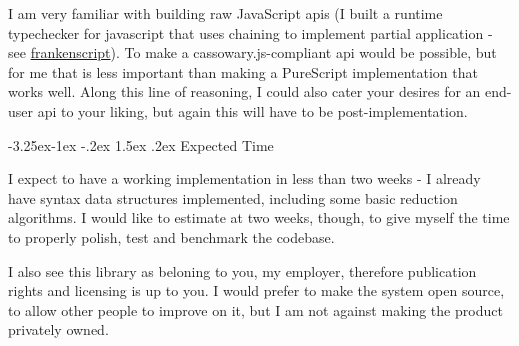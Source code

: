\documentclass[11pt,pressrelease]{newlfm} %
\makeatletter
\newcounter{section}
\newcounter{subsection}[section]
\newcommand\subsection{\@startsection{subsection}{2}{\z@}%
                                     {-3.25ex\@plus -1ex \@minus -.2ex}%
                                     {1.5ex \@plus .2ex}%
                                     {\normalfont\large\bfseries}}
\makeatother
\begin{document}
\begin{newlfm}
\begin{singlespace}
I am very familiar with building raw JavaScript apis (I built a runtime typechecker for javascript
that uses chaining to implement partial application - see
\href{http://github.com/athanclark/frankenscript}{frankenscript}). To make a cassowary.js-compliant
api would be possible, but for me that is less important than making a PureScript implementation that works
well. Along this line of reasoning, I could also cater your desires for an end-user api to your liking,
but again this will have to be post-implementation.

\subsection{Expected Time}

I expect to have a working implementation in less than two weeks - I already have syntax data structures
implemented, including some basic reduction algorithms. I would like to estimate at two weeks, though, to
give myself the time to properly polish, test and benchmark the codebase.

I also see this library as beloning to you, my employer, therefore publication rights and licensing is
up to you. I would prefer to make the system open source, to allow other people to improve on it, but
I am not against making the product privately owned.

\end{singlespace} %


\end{newlfm}
\end{document}
